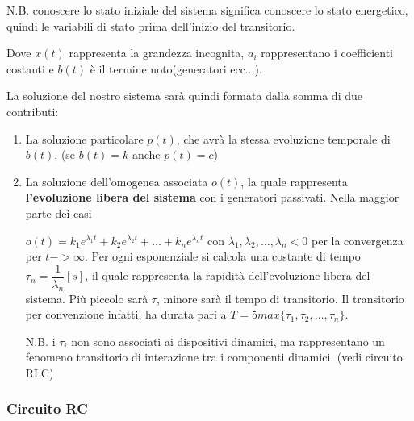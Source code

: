 \documentclass{article}
\begin{document}
\noindent N.B. conoscere lo stato iniziale del sistema significa conoscere lo stato energetico, quindi le variabili di stato prima dell'inizio
del transitorio.

\medskip
\noindent{}
\medskip

\noindent Dove $x(t)$ rappresenta la grandezza incognita, $a_i$ rappresentano i coefficienti costanti e $b(t)$ è il termine noto(generatori ecc...).

\noindent La soluzione del nostro sistema sarà quindi formata dalla somma di due contributi:
\begin{enumerate}
    \item La soluzione particolare $p(t)$, che avrà la stessa evoluzione temporale di $b(t)$. (se $b(t)=k$ anche $p(t)=c$)
    \item La soluzione dell'omogenea associata $o(t)$, la quale rappresenta \textbf{l'evoluzione libera del sistema} con i generatori 
    passivati. Nella maggior parte dei casi 
    
    \noindent $o(t)=k_1e^{\lambda_1t}+k_2e^{\lambda_2t}+\dots+k_ne^{\lambda_nt}$ con $\lambda_1,\lambda_2,\dots,\lambda_n < 0$ per la convergenza
    per $t->\infty$. Per ogni esponenziale si calcola una costante di tempo $\tau_n=\dfrac{1}{\lambda_n}[s]$, il quale rappresenta la rapidità
    dell'evoluzione libera del sistema. Più piccolo sarà $\tau$, minore sarà il tempo di transitorio. Il transitorio per convenzione infatti,
    ha durata pari a $T=5max\{\tau_1,\tau_2,\dots,\tau_n\}$. 

    \noindent N.B. i $\tau_i$ non sono associati ai dispositivi dinamici, ma rappresentano un fenomeno transitorio di interazione tra i componenti 
    dinamici. (vedi circuito RLC)
\end{enumerate}

\pagebreak

\subsubsection{Circuito RC}
\medskip
\noindent{}
\medskip
\end{document}
